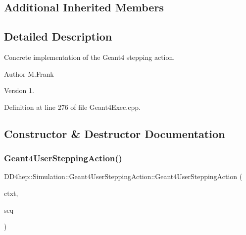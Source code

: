 \subsection*{Additional Inherited Members}


\subsection{Detailed Description}
Concrete implementation of the Geant4 stepping action. 

\begin{DoxyAuthor}{Author}
M.\+Frank 
\end{DoxyAuthor}
\begin{DoxyVersion}{Version}
1. 
\end{DoxyVersion}


Definition at line 276 of file Geant4\+Exec.\+cpp.



\subsection{Constructor \& Destructor Documentation}
\hypertarget{class_d_d4hep_1_1_simulation_1_1_geant4_user_stepping_action_a846e10589493c89d4ed2081312d17a1d}{}\label{class_d_d4hep_1_1_simulation_1_1_geant4_user_stepping_action_a846e10589493c89d4ed2081312d17a1d} 
\subsubsection{\texorpdfstring{Geant4\+User\+Stepping\+Action()}{Geant4UserSteppingAction()}}
{\footnotesize\ttfamily D\+D4hep\+::\+Simulation\+::\+Geant4\+User\+Stepping\+Action\+::\+Geant4\+User\+Stepping\+Action (\begin{DoxyParamCaption}\item[{\hyperlink{class_d_d4hep_1_1_simulation_1_1_geant4_context}{Geant4\+Context} $\ast$}]{ctxt,  }\item[{\hyperlink{class_d_d4hep_1_1_simulation_1_1_geant4_stepping_action_sequence}{Geant4\+Stepping\+Action\+Sequence} $\ast$}]{seq }\end{DoxyParamCaption})\hspace{0.3cm}{\ttfamily [inline]}}



